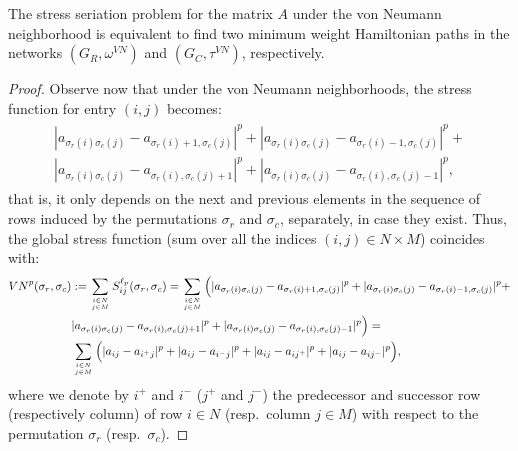 \documentclass[10pt,a4paper]{amsart}
\begin{document}
\begin{thm}\label{thm:1}
    The stress seriation problem for the matrix $A$ under the von Neumann neighborhood is equivalent to find two minimum weight Hamiltonian paths in the networks $(G_R,\omega^{VN})$ and $(G_C,\tau^{VN})$, respectively.
\end{thm}

\begin{proof}

Observe now that under the von Neumann neighborhoods, the stress function for entry $(i,j)$ becomes:
\begin{eqnarray*}
\begin{split}
|a_{\sigma_r(i)\sigma_c(j)} - a_{\sigma_r(i)+1,\sigma_c(j)}|^p + |a_{\sigma_r(i)\sigma_c(j)} - a_{\sigma_r(i)-1,\sigma_c(j)}|^p +\\ |a_{\sigma_r(i)\sigma_c(j)} - a_{\sigma_r(i),\sigma_c(j)+1}|^p +
|a_{\sigma_r(i)\sigma_c(j)} - a_{\sigma_r(i),\sigma_c(j)-1}|^p,
\end{split}
\end{eqnarray*}
that is, it only depends on the next and previous elements in the sequence of rows induced by the permutations $\sigma_r$ and $\sigma_c$, separately, in case they exist. Thus, the global stress function (sum over all the indices $(i,j) \in N \times M$) coincides with:
\begin{eqnarray*}
\begin{split}
{\rm VN}^p(\sigma_r,\sigma_c) &:= 
\sum_{i\in N\atop j \in M} S_{ij}^{\ell_p}(\sigma_r,\sigma_c) = 
\sum_{i\in N\atop j \in M} \Big(
|a_{\sigma_r(i)\sigma_c(j)} - a_{\sigma_r(i)+1,\sigma_c(j)}|^p + 
|a_{\sigma_r(i)\sigma_c(j)} - a_{\sigma_r(i)-1,\sigma_c(j)}|^p+ \\ &
|a_{\sigma_r(i)\sigma_c(j)} - a_{\sigma_r(i),\sigma_c(j)+1}|^p +
|a_{\sigma_r(i)\sigma_c(j)} - a_{\sigma_r(i),\sigma_c(j)-1}|^p
\Big) = \\
& \sum_{i\in N\atop j \in M} \Big(
|a_{ij} - a_{i^+j}|^p + |a_{ij} - a_{i^-j}|^p  + |a_{ij} - a_{ij^+}|^p +
|a_{ij} - a_{ij^-}|^p \Big),
\end{split}
\end{eqnarray*}
where we denote by $i^+$ and $i^-$ ($j^+$ and $j^-$) the predecessor and successor row (respectively column) of row $i\in N$ (resp.\ column $j\in M$) with respect to the permutation $\sigma_r$ (resp.\ $\sigma_c$). 


\end{proof}
\end{document}
